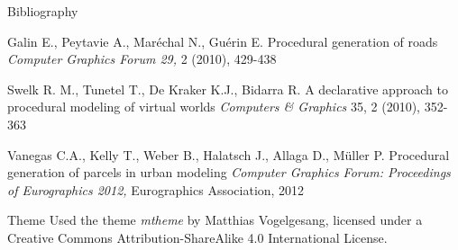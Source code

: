 \documentclass{beamer}
\begin{document}
\begin{frame}[allowframebreaks]{Bibliography}
\begin{thebibliography}{10}
    Galin E., Peytavie A., Maréchal N., Guérin E.
    \newblock Procedural generation of roads
    \newblock \emph{Computer Graphics Forum 29,} 2 (2010), 429-438

    Swelk R. M., Tunetel T., De Kraker K.J., Bidarra R.
    \newblock A declarative approach to procedural modeling of virtual worlds
    \newblock \emph{ Computers \& Graphics} 35, 2 (2010), 352-363

    Vanegas C.A., Kelly T., Weber B., Halatsch J., Allaga D., Müller P.
    \newblock Procedural generation of parcels in urban modeling
    \newblock \emph{Computer Graphics Forum: Proceedings of Eurographics 2012,} Eurographics Association, 2012

  \end{thebibliography} 
\end{frame}

\begin{frame}{Theme}
  Used the theme \emph{mtheme} by Matthias Vogelgesang, licensed under a Creative Commons
  Attribution-ShareAlike 4.0 International License.
\end{frame}
\end{document}
